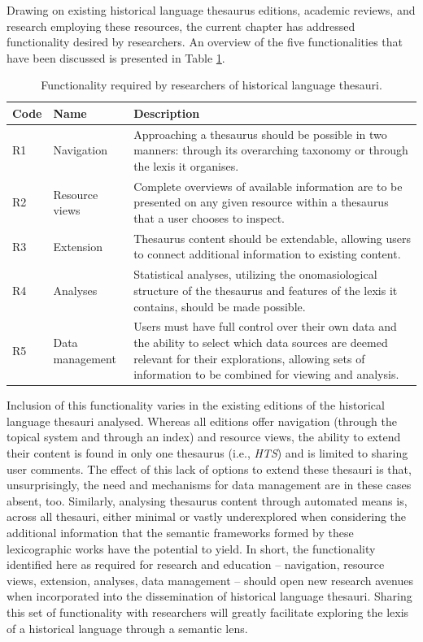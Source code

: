 Drawing on existing historical language thesaurus editions, academic reviews, and research employing these resources, the current chapter has addressed functionality desired by researchers. An overview of the five functionalities that have been discussed is presented in Table \ref{table:Stolk_thes-functionality:requirements}. 
%
\begin{table}[h!]
    \centering
    \small
    \begin{tabular}{llp{8.25cm}}
    \toprule
        \textbf{Code} & \textbf{Name} &
        \textbf{Description} \\ 
    \midrule
    R1 & Navigation & 
    Approaching a thesaurus should be possible in two manners: through its overarching taxonomy or through the lexis it organises. \\
    R2 & Resource views & 
    Complete overviews of available information are to be presented on any given resource within a thesaurus that a user chooses to inspect. \\
    R3 & Extension & 
    Thesaurus content should be extendable, allowing users to connect additional information to existing content. \\
    R4 & Analyses & 
    Statistical analyses, utilizing the onomasiological structure of the thesaurus and features of the lexis it contains, should be made possible. \\
    R5 & Data management & Users must have full control over their own data and the ability to select which data sources are deemed relevant for their explorations, allowing sets of information to be combined for viewing and analysis. \\
    \midrule
    \end{tabular}
    \caption[]{\label{table:Stolk_thes-functionality:requirements}Functionality required by researchers of historical language thesauri.}
\end{table}
%
Inclusion of this functionality varies in the existing editions of the historical language thesauri analysed. Whereas all editions offer navigation (through the topical system and through an index) and resource views, the ability to extend their content is found in only one thesaurus (i.e., \textit{HTS}) and is limited to sharing user comments. The effect of this lack of options to extend these thesauri is that, unsurprisingly, the need and mechanisms for data management are in these cases absent, too. Similarly, analysing thesaurus content through automated means is, across all thesauri, either minimal or vastly underexplored when considering the additional information that the semantic frameworks formed by these lexicographic works have the potential to yield. In short, the functionality identified here as required for research and education -- navigation, resource views, extension, analyses, data management -- should open new research avenues when incorporated into the dissemination of historical language thesauri. Sharing this set of functionality with researchers will greatly facilitate exploring the lexis of a historical language through a semantic lens.


